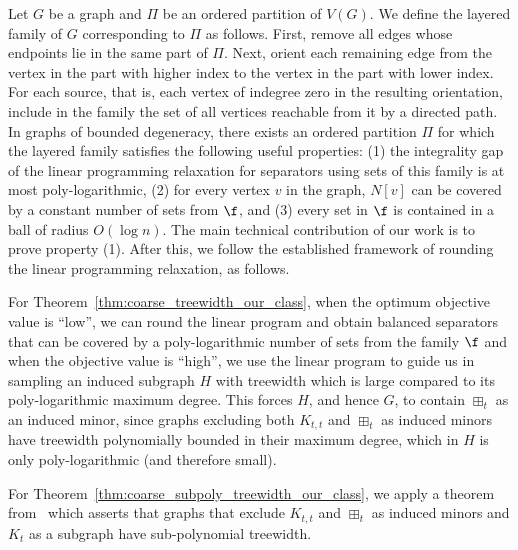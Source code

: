 
Let $G$ be a graph and $\Pi$ be an ordered partition of $V(G)$. We define the layered family of $G$ corresponding to $\Pi$ as follows. First, remove all edges whose endpoints lie in the same part of $\Pi$. Next, orient each remaining edge from the vertex in the part with higher index to the vertex in the part with lower index. For each source, that is, each vertex of indegree zero in the resulting orientation, include in the family the set of all vertices reachable from it by a directed path. In graphs of bounded degeneracy, there exists an ordered partition $\Pi$ for which the layered family satisfies the following useful properties: (1) the integrality gap of the linear programming relaxation for separators using sets of this family is at most poly-logarithmic, (2) for every vertex $v$ in the graph, $N[v]$ can be covered by a constant number of sets from $\f$, and (3) every set in $\f$ is contained in a ball of radius $O(\log n)$. The main technical contribution of our work is to prove property (1). After this, we follow the
established
framework of rounding the linear programming relaxation, as follows.
% 
% 
 
For Theorem~\ref{thm:coarse_treewidth_our_class}, when the optimum objective value is ``low'', we can round the linear program and obtain balanced separators that can be covered by a poly-logarithmic number of sets from the family $\f$ and when the objective value is ``high'', we use the linear program to guide us in sampling an induced subgraph $H$ with treewidth which is large compared to its poly-logarithmic maximum degree. This forces $H$, and hence $G$, to contain $\boxplus_t$ as an induced minor, since graphs excluding both $K_{t,t}$ and $\boxplus_t$ as induced minors have treewidth polynomially bounded in their maximum degree, which in $H$ is only poly-logarithmic (and therefore small).

For Theorem~\ref{thm:coarse_subpoly_treewidth_our_class}, we apply a theorem from~\cite{subpolynomialtreewidth} which asserts that graphs that exclude $K_{t,t}$ and $\boxplus_t$ as induced minors and $K_t$ as a subgraph have sub-polynomial treewidth.

